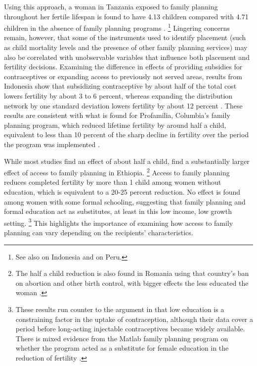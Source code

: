 \documentclass[letterpaper,12pt]{article}
\begin{document}
Using this approach, a woman in Tanzania exposed to family planning
throughout her fertile lifespan is found to have 4.13 children compared
with 4.71 children in the absence of family planning programs
\citep{angeles98}.%
\footnote{
See also \citet{Angeles2005} on Indonesia and \citep{Angeles2005a} on
Peru.} 
Lingering concerns remain, however, that some of the instruments used to
identify placement (such as child mortality levels and the presence of
other family planning services) may also be correlated with unobservable
variables that influence both placement and fertility decisions. 
Examining the difference in effects of providing subsidies for
contraceptives or expanding access to previously not served areas,
results from Indonesia show that subsidizing contraceptive by about half
of the total cost lowers fertility by about 3 to 6 percent, whereas
expanding the distribution network by one standard deviation lowers
fertility by about 12 percent \citep{Molyneaux2000}. 
These results are consistent with what is found for Profamilia,
Columbia's family planning program, which reduced lifetime fertility by
around half a child, equivalent to less than 10 percent of the sharp
decline in fertility over the period the program was implemented
\citep{Miller2010}.

While most studies find an effect of about half a child,
\citet{Portner2011} find a substantially larger effect of access to
family planning in Ethiopia.%
\footnote{
The half a child reduction is also found in Romania using that country's
ban on abortion and other birth control, with bigger effects the less
educated the woman \citep{Pop-Eleches2010}.} 
Access to family planning reduces completed fertility by more than 1
child among women without education, which is equivalent to a 20-25
percent reduction. 
No effect is found among women with some formal schooling, suggesting
that family planning and formal education act as substitutes, at least
in this low income, low growth setting.%
\footnote{
These results run counter to the argument in \citet{Feyisetan1996} that
low education is a constraining factor in the uptake of contraception,
although their data cover a period before long-acting injectable
contraceptives became widely available. 
There is mixed evidence from the Matlab family planning program on
whether the program acted as a substitute for female education in the
reduction of fertility \citep{Sinha2005,Joshi2007}.
} 
This highlights the importance of examining how access to family
planning can vary depending on the recipients' characteristics.
\end{document}
